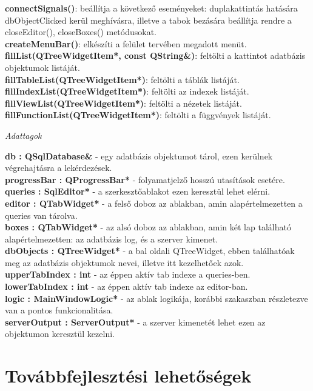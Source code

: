 \textbf{connectSignals()}: beállítja a következő eseményeket: duplakattintás hatására dbObjectClicked kerül meghívásra, illetve a tabok bezására beállítja rendre a closeEditor(), closeBoxes() metódusokat. \\
\textbf{createMenuBar()}: elkészíti a felület tervében megadott menüt. \\
\textbf{fillList(QTreeWidgetItem*, const QString\&)}: feltölti a kattintot adatbázis objektumok listáját. \\
\textbf{fillTableList(QTreeWidgetItem*)}: feltölti a táblák listáját. \\
\textbf{fillIndexList(QTreeWidgetItem*)}: feltölti az indexek listáját. \\
\textbf{fillViewList(QTreeWidgetItem*)}: feltölti a nézetek listáját. \\
\textbf{fillFunctionList(QTreeWidgetItem*)}: feltölti a függvények listáját.
\begin{flushleft}
\textit{Adattagok}
\end{flushleft}
\textbf{db : QSqlDatabase\&} - egy adatbázis objektumot tárol, ezen kerülnek végrehajtásra a lekérdezések. \\
\textbf{progressBar : QProgressBar*} - folyamatjelző hosszú utasítások esetére. \\
\textbf{queries : SqlEditor*} - a szerkesztőablakot ezen keresztül lehet elérni. \\
\textbf{editor : QTabWidget*} - a felső doboz az ablakban, amin alapértelmezetten a queries van tárolva. \\
\textbf{boxes : QTabWidget*} - az alsó doboz az ablakban, amin két lap található alapértelmezetten: az adatbázis log, és a szerver kimenet. \\
\textbf{dbObjects : QTreeWidget*} - a bal oldali QTreeWidget, ebben találhatóak meg az adatbázis objektumok nevei, illetve itt kezelhetőek azok. \\
\textbf{upperTabIndex : int} - az éppen aktív tab indexe a queries-ben. \\
\textbf{lowerTabIndex : int} - az éppen aktív tab indexe az editor-ban. \\
\textbf{logic : MainWindowLogic*} - az ablak logikája, korábbi szakaszban részletezve van a pontos funkcionalitása. \\
\textbf{serverOutput : ServerOutput*} - a szerver kimenetét lehet ezen az objektumon keresztül kezelni.

\section{Továbbfejlesztési lehetőségek}

